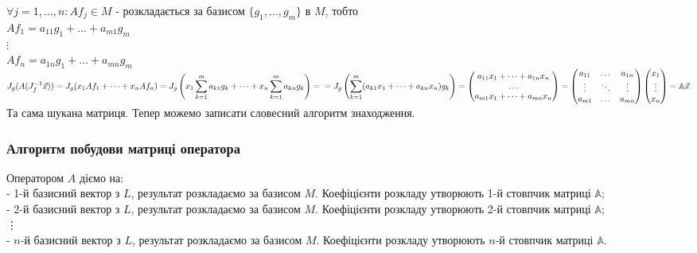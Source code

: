 \documentclass[a4paper, 10pt]{article}
\theoremstyle{theoremdd}
\begin{document}
	$\forall j = 1,\dots,n: Af_j \in M$ - розкладається за базисом $\{g_1,\dots,g_m\}$ в $M$, тобто\\
	$Af_1 = a_{11}g_1 + \dots + a_{m1}g_m$\\
	$\vdots$\\
	$Af_n = a_{1n}g_1 + \dots + a_{mn}g_m$\\
	$J_g(A(J_f^{-1}\vec{x})) = J_g(x_1Af_1 + \dots + x_nAf_n) = \displaystyle J_g\left(x_1 \sum_{k=1}^m a_{k1}g_k + \dots + x_n \sum_{k=1}^m a_{kn}g_k\right) = \\ = J_g\left(\sum_{k=1}^m (a_{k1}x_1 + \dots + a_{kn}x_n)g_k \right) = \begin{pmatrix}
	a_{11}x_1 + \dots + a_{1n}x_n \\
	\dots \\
	a_{m1}x_1 + \dots + a_{mn}x_n \\
	\end{pmatrix} = \begin{pmatrix}
	a_{11} & \dots & a_{1n} \\
	\vdots & \ddots & \vdots \\
	a_{m1} & \dots & a_{mn}
	\end{pmatrix} \begin{pmatrix}
	x_1 \\ \vdots \\ x_n
	\end{pmatrix} = \mathbb{A}\vec{x}$\\
	Та сама шукана матриця. Тепер можемо записати словесний алгоритм знаходження.
	
	\subsubsection*{Алгоритм побудови матриці оператора}
	Оператором $A$ діємо на:\\
	- 1-й базисний вектор з $L$, результат розкладаємо за базисом $M$. Коефіцієнти розкладу утворюють 1-й стовпчик матриці $\mathbb{A}$;\\
	- 2-й базисний вектор з $L$, результат розкладаємо за базисом $M$. Коефіцієнти розкладу утворюють 2-й стовпчик матриці $\mathbb{A}$;\\
	\vdots \\
	- $n$-й базисний вектор з $L$, результат розкладаємо за базисом $M$. Коефіцієнти розкладу утворюють $n$-й стовпчик матриці $\mathbb{A}$.
	
\end{document}
